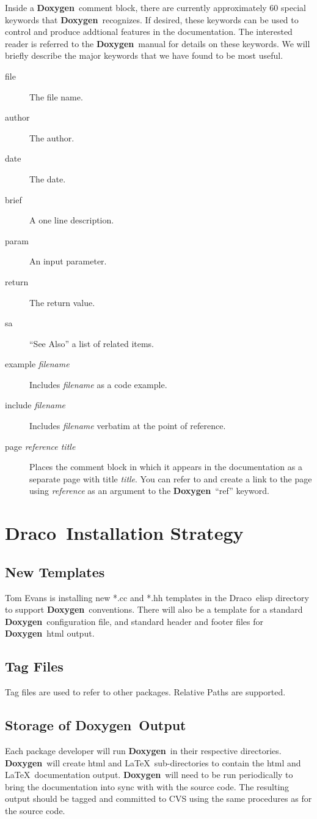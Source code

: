 \documentclass[11pt]{nmemo}
\newcommand{\draco}{{\normalfont\sffamily Draco}}
\newcommand{\doxy}{{\normalfont\bfseries Doxygen}}
\begin{document}
Inside a \doxy\ comment block, there are currently approximately 60 special
keywords that \doxy\ recognizes. If desired, these keywords can be used to 
control and produce addtional features in the documentation. 
The interested reader is referred to the \doxy\
manual for details on these keywords. 
We will briefly describe the major keywords that we have
found to be most useful. 
\begin{description}
\item [file] The file name.
\item [author] The author.
\item [date] The date.
\item [brief] A one line description.
\item [param] An input parameter.
\item [return] The return value.
\item [sa] ``See Also'' a list of related items.
\item [example {\em filename}] Includes {\em filename} as a code example.
\item [include {\em filename}] Includes {\em filename} verbatim at the point of
  reference.
\item [page {\em reference title}] Places the comment block in which it appears in the documentation
as a separate page with title {\em title}. You can refer to and create a link
to the page using {\em reference} as an argument to the \doxy\ ``ref'' keyword. 
\end{description}


\section{\draco\ Installation Strategy}
  \subsection{New Templates}
  Tom Evans is installing new *.cc and *.hh templates in the \draco\ elisp
directory to support \doxy\ conventions. There will also be a
template for a standard \doxy\ configuration file, and standard header
and footer files for \doxy\ html output.
  
\subsection{Tag Files}
Tag files are used to refer to other packages. Relative Paths are supported.

  \subsection{Storage of \doxy\ Output}
Each package developer will run \doxy\ in their respective directories. 
\doxy\ will create html and \LaTeX\ sub-directories to contain the
html and \LaTeX\ documentation output. \doxy\ will need to be
run periodically to bring the documentation into sync with with the
source code. The resulting output should be tagged and committed to
CVS using the same procedures as for the source code.
\end{document}
